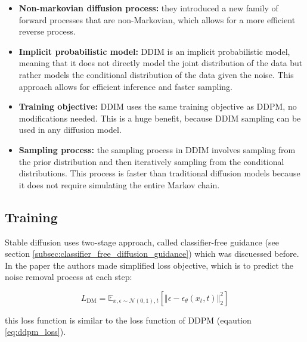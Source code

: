 \begin{itemize}
    \item \textbf{Non-markovian diffusion process:} they introduced a new family of forward processes that are non-Markovian, which allows for a more efficient reverse process.
    \item \textbf{Implicit probabilistic model:} DDIM is an implicit probabilistic model, meaning that it does not directly model the joint distribution of the data but rather models the conditional distribution of the data given the noise. This approach allows for efficient inference and faster sampling.
    \item \textbf{Training objective:} DDIM uses the same training objective as DDPM, no modifications needed. This is a huge benefit, because DDIM sampling can be used in any diffusion model.
    \item \textbf{Sampling process:} the sampling process in DDIM involves sampling from the prior distribution and then iteratively sampling from the conditional distributions. This process is faster than traditional diffusion models because it does not require simulating the entire Markov chain.
\end{itemize}
















\subsection{Training}

Stable diffusion uses two-stage approach, called classifier-free guidance (see section \ref{subsec:classifier_free_diffusion_guidance}) which was discuessed before. In the paper the authors made simplified loss objective, which is to predict the noise removal process at each step:

\[
    L_{\text{DM}} = \mathbb{E}_{x, \epsilon \sim \mathcal{N} (0, 1), t} [ \Vert \epsilon - \epsilon_\theta(x_t, t) \Vert _2^2 ]
\]

this loss function is similar to the loss function of DDPM (eqaution \ref{eq:ddpm_loss}).














